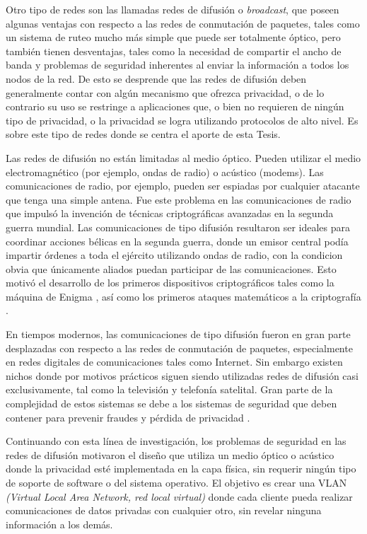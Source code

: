 Otro tipo de redes son las llamadas redes de difusión o \textit{broadcast}, que poseen algunas ventajas con respecto a las redes de conmutación de paquetes, tales como un sistema de ruteo mucho más simple que puede ser totalmente óptico, pero también tienen desventajas, tales como la necesidad de compartir el ancho de banda y problemas de seguridad inherentes al enviar la información a todos los nodos de la red. De esto se desprende que las redes de difusión deben generalmente contar con algún mecanismo que ofrezca privacidad, o de lo contrario su uso se restringe a aplicaciones que, o bien no requieren de ningún tipo de privacidad, o la privacidad se logra utilizando protocolos de alto nivel. Es sobre este tipo de redes donde se centra el aporte de esta Tesis.

Las redes de difusión no están limitadas al medio óptico. Pueden utilizar el medio electromagnético (por ejemplo, ondas de radio) o acústico (modems). Las comunicaciones de radio, por ejemplo, pueden ser espiadas por cualquier atacante que tenga una simple antena. Fue este problema en las comunicaciones de radio que impulsó la invención de técnicas criptográficas avanzadas en la segunda guerra mundial. Las comunicaciones de tipo difusión resultaron ser ideales para coordinar acciones bélicas en la segunda guerra, donde un emisor central podía impartir órdenes a toda el ejército utilizando ondas de radio, con la condicion obvia que únicamente aliados puedan participar de las comunicaciones. Esto motivó el desarrollo de los primeros dispositivos criptográficos tales como la máquina de Enigma \cite{kozaczuk1984enigma}, así como los primeros ataques matemáticos a la criptografía \cite{welchman1982hut}.

En tiempos modernos, las comunicaciones de tipo difusión fueron en gran parte desplazadas con respecto a las redes de conmutación de paquetes, especialmente en redes digitales de comunicaciones tales como Internet. Sin embargo existen nichos donde por motivos prácticos siguen siendo utilizadas redes de difusión casi exclusivamente, tal como la televisión y telefonía satelital. Gran parte de la complejidad de estos sistemas se debe a los sistemas de seguridad que deben contener para prevenir fraudes y pérdida de privacidad \cite{hanas1981addressable}.

Continuando con esta línea de investigación, los problemas de seguridad en las redes de difusión motivaron el diseño que utiliza un medio óptico o acústico donde la privacidad esté implementada en la capa física, sin requerir ningún tipo de soporte de software o del sistema operativo. El objetivo es crear una VLAN \textit{(Virtual Local Area Network, red local virtual)} donde cada cliente pueda realizar comunicaciones de datos privadas con cualquier otro, sin revelar ninguna información a los demás.

